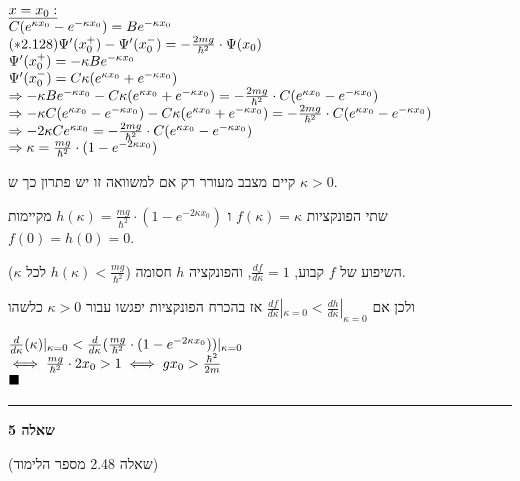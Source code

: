 \documentclass[14pt]{extarticle}
\makeatletter
\newenvironment{lefteqs}{%
    \begin{english}%
    \begin{flushleft}%
    \renewcommand{\arraystretch}{1.3}%
    $\begin{array}{@{}l@{}}%
}{%
    \end{array}$%
    \end{flushleft}%
    \end{english}%
}
\makeatother
\begin{document}
\begin{lefteqs}
    \underline{x=x_0:} \\
    C (e^{\kappa x_0} - e^{-\kappa x_0}) = B e^{-\kappa x_0} \\
    (*2.128) \Psi'(x_0^{+}) - \Psi'(x_0^{-}) = -\frac{2mg}{\hbar^2} \cdot \Psi(x_0) \\
    \Psi'(x_0^{+}) = -\kappa B e^{-\kappa x_0} \\
    \Psi'(x_0^{-}) = C \kappa (e^{\kappa x_0} + e^{-\kappa x_0}) \\
    \Rightarrow -\kappa B e^{-\kappa x_0} - C \kappa (e^{\kappa x_0} + e^{-\kappa x_0}) = -\frac{2mg}{\hbar^2} \cdot C (e^{\kappa x_0} - e^{-\kappa x_0}) \\
    \Rightarrow -\kappa C (e^{\kappa x_0} - e^{-\kappa x_0}) - C \kappa (e^{\kappa x_0} + e^{-\kappa x_0}) = -\frac{2mg}{\hbar^2} \cdot C (e^{\kappa x_0} - e^{-\kappa x_0}) \\
    \Rightarrow -2\kappa C e^{\kappa x_0} = -\frac{2mg}{\hbar^2} \cdot C (e^{\kappa x_0} - e^{-\kappa x_0}) \\
    \Rightarrow \kappa = \frac{mg}{\hbar^2} \cdot (1 - e^{-2\kappa x_0}) \\
\end{lefteqs}

קיים מצבב מעורר רק אם למשוואה זו יש פתרון כך ש $\kappa >0$.

שתי הפונקציות $f(\kappa) = \kappa$ ו $h(\kappa) = \frac{mg}{\hbar^2} \cdot (1 - e^{-2\kappa x_0})$ מקיימות $f(0)=h(0)=0$.

השיפוע של $f$ קבוע, $\frac{df}{d\kappa} = 1$, והפונקציה $h$ חסומה ($h(\kappa) < \frac{mg}{\hbar^2}$ לכל $\kappa$).

ולכן אם $\frac{df}{d\kappa} |_{\kappa=0} < \frac{dh}{d\kappa} |_{\kappa=0}$ אז בהכרח הפונקציות יפגשו עבור $\kappa > 0$ כלשהו

\begin{lefteqs}
    \frac{d}{d\kappa} (\kappa) |_{\kappa=0} < \frac{d}{d\kappa} (\frac{mg}{\hbar^2} \cdot (1 - e^{-2\kappa x_0})) |_{\kappa=0} \\
    \iff \frac{mg}{\hbar^2} \cdot 2x_0 > 1 \iff gx_0 > \frac{\hbar^2}{2m} \\
    \blacksquare
\end{lefteqs}

\vspace{3em}
\hrule
\vspace{2em}

\textbf{\large שאלה 5}

(שאלה 2.48 מספר הלימוד)
\end{document}
